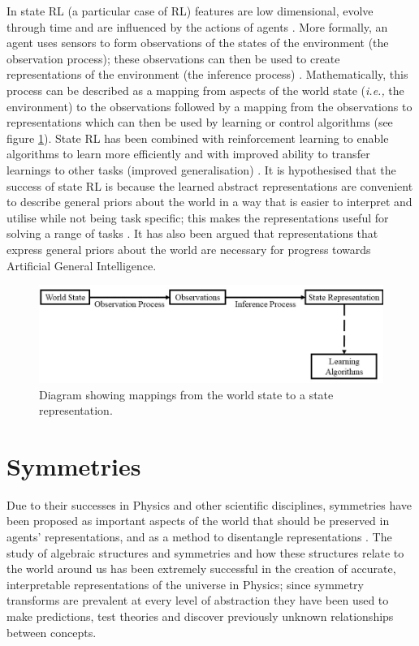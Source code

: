 In state RL (a particular case of RL) features are low dimensional, evolve through time and are influenced by the actions of agents \autocite{Lesort2018StateRL}.
More formally, an agent uses sensors to form observations of the states of the environment (the observation process); these observations can then be used to create representations of the environment (the inference process) \autocite{Russell2010}.
Mathematically, this process can be described as a mapping from aspects of the world state (\textit{i.e.,} the environment) to the observations followed by a mapping from the observations to representations which can then be used by learning or control algorithms (see figure \ref{fig:intro-flow-chart}).
State RL has been combined with reinforcement learning to enable algorithms to learn more efficiently and with improved ability to transfer learnings to other tasks (improved generalisation) \autocite{Munk2016}.
It is hypothesised that the success of state RL is because the learned abstract representations are convenient to describe general priors about the world in a way that is easier to interpret and utilise while not being task specific; this makes the representations useful for solving a range of tasks \autocite{Bengio2013}.
It has also been argued that representations that express general priors about the world are necessary for progress towards Artificial General Intelligence.

\begin{figure}[H]
    \centering
    \includegraphics[width = \textwidth]{1Introduction/Old/Images/fig-intro-flow-chart.jpg}
    \caption{Diagram showing mappings from the world state to a state representation.}
    \label{fig:intro-flow-chart}
\end{figure}

\section{Symmetries}

Due to their successes in Physics and other scientific disciplines, symmetries have been proposed as important aspects of the world that should be preserved in agents' representations, and as a method to disentangle representations \autocite{Higgins2018}.
The study of algebraic structures and symmetries and how these structures relate to the world around us has been extremely successful in the creation of accurate, interpretable representations of the universe in Physics; since symmetry transforms are prevalent at every level of abstraction they have been used to make predictions, test theories and discover previously unknown relationships between concepts.


